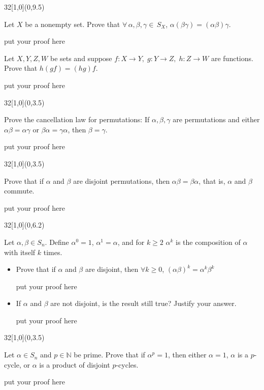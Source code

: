 \documentclass[12pt]{article}
\newenvironment{exercise}[2]{\begin{textblock}{32}[1,0](0,#2)\noindent#1\end{textblock}}{\vspace{1in}}
\begin{document}
\begin{exercise}{1.3}{9.5}
	{\noindent}Let $X$ be a nonempty set. Prove that $\forall\, \alpha, \beta, \gamma\in \, S_X$, $\alpha(\beta\gamma)=(\alpha\beta)\gamma$.
	\bigskip

	put your proof here
	\vspace{1in}

	{\noindent}Let $X,Y,Z,W$ be sets and suppose $f:X\to Y,\; g:Y\to Z,\; h:Z\to W$ are functions. Prove that $h(gf)=(hg)f$.
	\bigskip

	put your proof here
\end{exercise}


\begin{exercise}{1.6}{3.5}
	{\noindent}Prove the cancellation law for permutations: If $\alpha, \beta, \gamma$ are permutations and either $\alpha\beta=\alpha\gamma$ or $\beta\alpha=\gamma\alpha$, then $\beta=\gamma$.
	\bigskip

	put your proof here
\end{exercise}


\begin{exercise}{1.8}{3.5}
	{\noindent}Prove that if $\alpha$ and $\beta$ are disjoint permutations, then $\alpha\beta=\beta\alpha$, that is, $\alpha$ and $\beta$ commute.
	\bigskip

	put your proof here
\end{exercise}


\begin{exercise}{1.10}{6.2}
  {\noindent}Let $\alpha, \beta\in S_n$. Define $\alpha^0=1$, $\alpha^1=\alpha$, and for $k\ge 2$ $\alpha^k$ is the composition of $\alpha$ with itself $k$ times.
  \begin{itemize}
    \item Prove that if $\alpha$ and $\beta$ are disjoint, then $\forall k\ge0$, $(\alpha\beta)^k=\alpha^k\beta^k$
    \bigskip

  	put your proof here
  	\vspace{1in}

    \item If $\alpha$ and $\beta$ are not disjoint, is the result still true? Justify your answer.
	  \bigskip

  	put your proof here
  \end{itemize}
\end{exercise}

\begin{exercise}{1.16}{3.5}
	{\noindent}Let $\alpha\in S_n$ and $p\in \mathbb{N}$ be prime. Prove that if $\alpha^p=1$, then either $\alpha=1$, $\alpha$ is a $p$-cycle, or $\alpha$ is a product of disjoint $p$-cycles.
	\bigskip

	put your proof here
\end{exercise}
\end{document}
